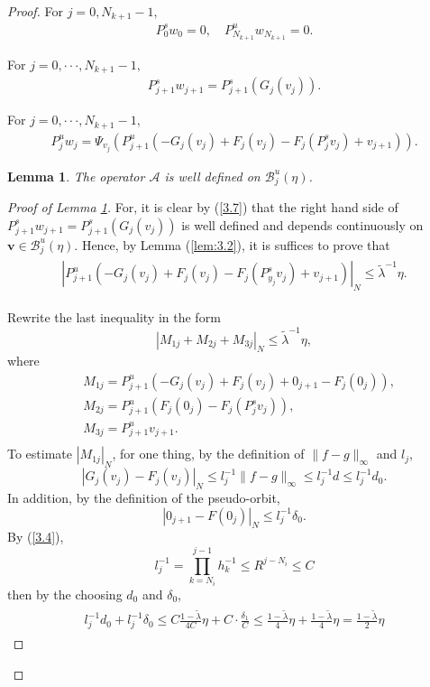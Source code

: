 \documentclass[12pt]{article}
\newtheorem{lemma}{Lemma}[section]
\begin{document}
\begin{proof}
	For $ j=0,N_{k+1}-1, $
	\begin{align}\label{3.6}
		P_{0}^{s}w_{0}=0, \quad
		P_{N_{k+1}}^{u}w_{N_{k+1}}=0.
	\end{align}
	
	For $ j=0,\cdot\cdot\cdot,N_{k+1}-1, $
	\begin{align}\label{3.7}
		P_{j+1}^{s}w_{j+1}=P_{j+1}^{s}(G_{j}(v_{j})).
	\end{align}
	
	For $ j=0,\cdot\cdot\cdot,N_{k+1}-1,$
	\begin{align}\label{3.8}
		P_{j}^{u}w_{j}=\Psi_{v_{j}}(P_{j+1}^{u}(-G_{j}(v_{j})+F_{j}(v_{j})-F_{j}(P_{j}^{s}v_{j})+v_{j+1})).
	\end{align}
	
	\begin{lemma}\label{lem:3.3} 	The operator $ \mathcal{A} $ is well defined on $ \mathcal{B}_{j}^{u}(\eta) $.
	\end{lemma}
	\begin{proof}[Proof of Lemma \ref{lem:3.3}]
		For, it is clear by (\ref{3.7}) that the right hand side of $ P_{j+1}^{s}w_{j+1}=P_{j+1}^{s}(G_{j}(v_{j})) $ is well
		defined and depends continuously on $ \boldsymbol{v}\in \mathcal{B}_{j}^{u}(\eta) $. Hence, by Lemma (\ref{lem:3.2}), it is suffices to prove that
		\begin{align}\label{3.9}
			\begin{split}
				|P_{j+1}^{u}(-G_{j}(v_{j})+F_{j}(v_{j})-F_{j}(P_{y_{j}}^{s}v_{j})+v_{j+1})|_{N}\leqslant\widetilde\lambda^{-1}\eta.
			\end{split}
		\end{align}
		
		Rewrite the last inequality in the form
		$$
		|M_{1j}+M_{2j}+M_{3j}|_{N}\leqslant\widetilde\lambda^{-1}\eta,
		$$
		where$$
		\begin{aligned}
			&M_{1j}=P_{j+1}^{u}(-G_{j}(v_{j})+F_{j}(v_{j})+0_{j+1}-F_{j}(0_{j})),  \\
			&M_{2j}=P_{j+1}^{u}(F_{j}(0_{j})-F_{j}(P_{j}^{s}v_{j})), \\
			&M_{3j}=P_{j+1}^{u}v_{j+1}.  \\
		\end{aligned}$$
		To estimate $ |M_{1j}|_{N} $, for one thing, by the definition of $ \|f - g\|_\infty $ and $ l_{j} $,
		$$ |G_{j}(v_{j})-F_{j}(v_{j})|_{N}\leqslant l_{j}^{-1}\|f - g\|_\infty\leqslant l_{j}^{-1}d\leqslant l_{j}^{-1}d_0. $$
		In addition, by the definition of the pseudo-orbit, $$\left|0_{j+1}-F\left(0_j\right)\right|_{N}
		\leq l^{-1}_j\delta_{0}.$$
		By (\ref{3.4}), $$ l_{j}^{-1}=\prod_{k=N_{i}}^{j-1}h_{k}^{-1}\leqslant R^{j-N_{i}} \leqslant C $$
		then by the choosing $ d_0 $ and $ \delta_{0} $, 
		\begin{align} \label{3.10}
			\begin{split}
				l_{j}^{-1}d_0+l_{j}^{-1}\delta_{0}
				\leqslant C\frac{1-\widetilde{\lambda}}{4C}\eta+C\cdot\frac{\delta_{1} }{C} 
				\leqslant   \frac{1-\widetilde{\lambda}}{4}\eta+\frac{1-\widetilde{\lambda}}{4}\eta=\frac{1-\widetilde\lambda}{2}\eta
			\end{split}
		\end{align}
		

\end{proof}
\end{proof}
\end{document}
